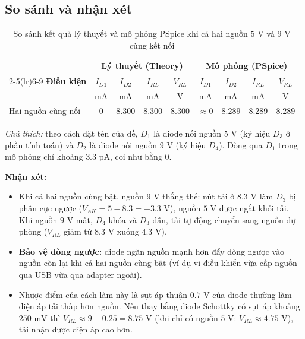 \subsection{So sánh và nhận xét}
\begin{table}[H]
  \centering
  \caption{So sánh kết quả lý thuyết và mô phỏng PSpice khi cả hai nguồn $5\text{ V}$ và $9\text{ V}$ cùng kết nối}
  \small
  \setlength{\tabcolsep}{3.5pt}
  \begin{tabular}{lcccccccc}
    \toprule
    & \multicolumn{4}{c}{\textbf{Lý thuyết (Theory)}} & \multicolumn{4}{c}{\textbf{Mô phỏng (PSpice)}} \\
    \cmidrule(lr){2-5}\cmidrule(lr){6-9}
    \textbf{Điều kiện} & $I_{D1}$ & $I_{D2}$ & $I_{RL}$ & $V_{RL}$ & $I_{D1}$ & $I_{D2}$ & $I_{RL}$ & $V_{RL}$ \\
    & {\scriptsize mA} & {\scriptsize mA} & {\scriptsize mA} & {\scriptsize V} & {\scriptsize mA} & {\scriptsize mA} & {\scriptsize mA} & {\scriptsize V} \\
    \midrule
    Hai nguồn cùng nối & 0 & 8.300 & 8.300 & 8.300 & $\approx 0$ & 8.289 & 8.289 & 8.289 \\
    \bottomrule
  \end{tabular}
\end{table}

\noindent\textit{Chú thích:} theo cách đặt tên của đề, $D_1$ là diode nối nguồn $5\text{ V}$ (ký hiệu $D_3$ ở phần tính toán) và $D_2$ là diode nối nguồn $9\text{ V}$ (ký hiệu $D_4$). Dòng qua $D_1$ trong mô phỏng chỉ khoảng $3.3\text{ pA}$, coi như bằng $0$.

\noindent\textbf{Nhận xét:}
\begin{itemize}[leftmargin=1.5em]
  \item Khi cả hai nguồn cùng bật, nguồn $9\text{ V}$ thắng thế: nút tải ở $8.3\text{ V}$ làm $D_3$ bị phân cực ngược ($V_{AK} = 5 - 8.3 = -3.3\text{ V}$), nguồn $5\text{ V}$ được ngắt khỏi tải. Khi nguồn $9\text{ V}$ mất, $D_4$ khóa và $D_3$ dẫn, tải tự động chuyển sang nguồn dự phòng ($V_{RL}$ giảm từ $8.3\text{ V}$ xuống $4.3\text{ V}$).
  \item \textbf{Bảo vệ dòng ngược:} diode ngăn nguồn mạnh hơn đẩy dòng ngược vào nguồn còn lại khi cả hai nguồn cùng bật (ví dụ vi điều khiển vừa cấp nguồn qua USB vừa qua adapter ngoài).
  \item Nhược điểm của cách làm này là sụt áp thuận $0.7\text{ V}$ của diode thường làm điện áp tải thấp hơn nguồn. Nếu thay bằng diode Schottky có sụt áp khoảng $250\text{ mV}$ thì $V_{RL} \approx 9 - 0.25 = 8.75\text{ V}$ (khi chỉ có nguồn $5\text{ V}$: $V_{RL} \approx 4.75\text{ V}$), tải nhận được điện áp cao hơn.
\end{itemize}
